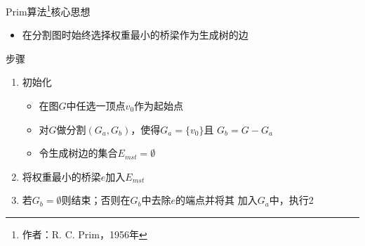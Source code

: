 \begin{fragile}
    \frametitle{\insertsectionhead}
    \begin{block}{Prim算法\footnote{作者：R. C. Prim，1956年}核心思想}
        \begin{itemize}
            \item 在分割图时始终选择权重\alert{最小}的桥梁作为生成树的边
        \end{itemize}
    \end{block}
    \begin{exampleblock}{步骤}
        \begin{enumerate}
            \item 初始化
                  \begin{itemize}
                      \item 在图$G$中任选一顶点$v_{0}$作为起始点
                      \item 对$G$做分割$(G_{a},G_{b})$，使得$G_{a}=\{v_{0}\}$且
                            $G_{b}=G-G_{a}$
                      \item 令生成树边的集合$E_{mst}=\emptyset$
                  \end{itemize}
            \item 将权重最小的桥梁$e$加入$E_{mst}$
            \item 若$G_{b}=\emptyset$则结束；否则在$G_{b}$中去除$e$的端点并将其
                  加入$G_{a}$中，执行2
        \end{enumerate}
    \end{exampleblock}
\end{fragile}

